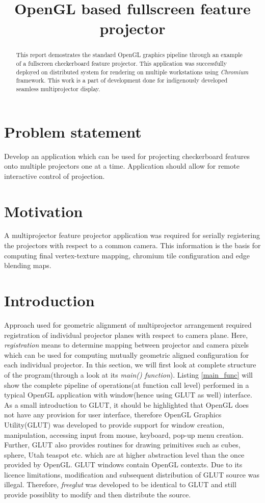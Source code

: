 \documentclass{article}
\begin{document}
\title{OpenGL based fullscreen feature projector}
\maketitle

\begin{abstract}
This report demostrates the standard OpenGL graphics pipeline through an example of a fullscreen checkerboard feature projector. This application was successfully deployed on distributed system for rendering on multiple workstations using \textit{Chromium} framework. This work is a part of development done for indigenously developed seamless multiprojector display.
\end{abstract}

\section{Problem statement}
Develop an application which can be used for projecting checkerboard features onto multiple projectors one at a time. Application should allow for remote interactive control of projection. 

\section{Motivation}
A multiprojector feature projector application was required for serially registering the projectors with respect to a common camera. This information is the basis for computing final vertex-texture mapping, chromium tile configuration and edge blending maps. 

\section{Introduction}
Approach used for geometric alignment of multiprojector arrangement required registration of individual projector planes with respect to camera plane. Here, \textit{registration} means to determine mapping between projector and camera pixels which can be used for computing mutually geometric aligned configuration for each individual projector. \newline
In this section, we will first look at complete structure of the program(through a look at its \textit{main() function}). Listing \ref{main_func} will show the complete pipeline of operations(at function call level) performed in a typical OpenGL application with window(hence using GLUT as well) interface. As a small introduction to GLUT, it should be highlighted that OpenGL does not have any provision for user interface, therefore OpenGL Graphics Utility(GLUT) was developed to provide support for window creation, manipulation, accessing input from mouse, keyboard, pop-up menu creation. Further, GLUT also provides routines for drawing primitives such as cubes, sphere, Utah teaspot etc. which are at higher abstraction level than the once provided by OpenGL. GLUT windows contain OpenGL contexts. Due to its licence limitations, modification and subsequent distribution of GLUT source was illegal. Therefore, \textit{freeglut} was developed to be identical to GLUT and still provide possiblity to modify and then distribute the source.
\end{document}
